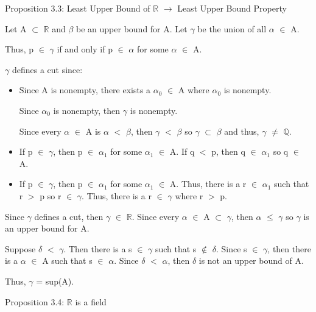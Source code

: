 { \color{blue} Proposition 3.3: Least Upper Bound of $\mathbb{R}$
$\rightarrow$ Least Upper Bound Property } 

	\begin{adjustbox}{minipage=16cm, right, vspace=0.1cm 0cm}
		Let A $\subset$ $\mathbb{R}$ and $\beta$ be an upper bound for A.
		Let $\gamma$ be the union of all $\alpha$ $\in$ A.

		Thus, p $\in$ $\gamma$ if and only if p $\in$ $\alpha$ for some $\alpha$ $\in$ A.

		$\gamma$ defines a cut since:

		\begin{itemize}[leftmargin=1cm, itemsep=0.1cm]
			\item Since A is nonempty, there exists a $\alpha_0$ $\in$ A where $\alpha_0$ is nonempty.

				Since $\alpha_0$ is nonempty, then $\gamma$ is nonempty.

				Since every $\alpha$ $\in$ A is $\alpha$ $<$ $\beta$, then $\gamma$ $<$ $\beta$
				so $\gamma$ $\subset$ $\beta$ and thus, $\gamma$ $\neq$ $\mathbb{Q}$.

			\item If p $\in$ $\gamma$, then p $\in$ $\alpha_1$ for some $\alpha_1$ $\in$ A.
				If q $<$ p, then q $\in$ $\alpha_1$ so q $\in$ A.

			\item If p $\in$ $\gamma$, then p $\in$ $\alpha_1$ for some $\alpha_1$ $\in$ A.
				Thus, there is a r $\in$ $\alpha_1$ such that r $>$ p so r $\in$ $\gamma$.
				Thus, there is a r $\in$ $\gamma$ where r $>$ p.
		\end{itemize}

		Since $\gamma$ defines a cut, then $\gamma$ $\in$ $\mathbb{R}$.
		Since every $\alpha$ $\in$ A $\subset$ $\gamma$, then $\alpha$ $\leq$ $\gamma$
		so $\gamma$ is an upper bound for A.

		Suppose $\delta$ $<$ $\gamma$. Then there is a s $\in$ $\gamma$
		such that s $\not \in$ $\delta$.
		Since s $\in$ $\gamma$, then there is a $\alpha$ $\in$ A such that s $\in$ $\alpha$.
		Since $\delta$ $<$ $\alpha$, then $\delta$ is not an upper bound of A.

		Thus, $\gamma$ = sup(A).
	\end{adjustbox}

\newpage

{ \color{blue} Proposition 3.4: $\mathbb{R}$ is a field} 

